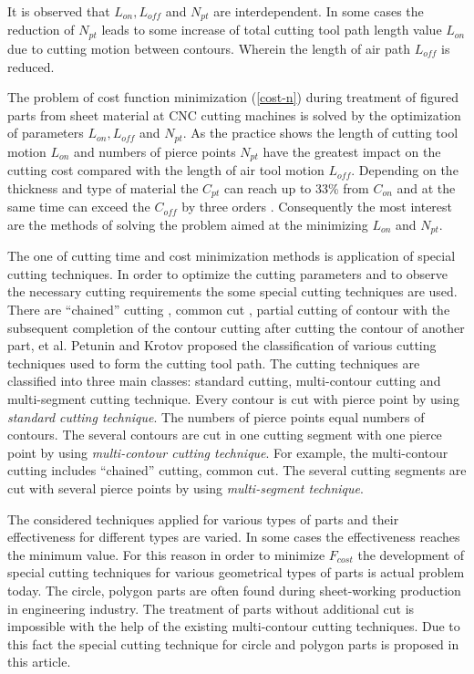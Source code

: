 \documentclass[runningheads]{llncs}
\begin{document}
It is observed that $L_{on}, L_{off}$ and $N_{pt}$
are interdependent.
In some cases the reduction of  $N_{pt}$
leads to some increase of total cutting tool path length value $L_{on}$
due to cutting motion between contours.
Wherein the length of air path $L_{off}$ is reduced.

The problem of cost function minimization (\ref{cost-n})
during treatment of figured parts from sheet material
at CNC cutting machines is solved by the optimization of parameters
$L_{on}, L_{off}$ and $N_{pt}$.
As the practice shows the length of cutting tool motion  $L_{on}$
and numbers of pierce points $N_{pt}$
have the greatest impact on the cutting cost compared with the length of air tool motion $L_{off}$.
Depending on the thickness and type of material the $C_{pt}$
can reach up to 33\% from $C_{on}$
and at the same time can exceed the $C_{off}$
by three orders \cite{ru14}.
Consequently the most interest are the methods of solving the problem aimed at the minimizing
$L_{on}$ and $N_{pt}$.

The one of cutting time and cost minimization methods is
application of special cutting techniques.
In order to optimize the cutting parameters
and to observe the necessary cutting requirements
the some special cutting techniques are used.
There are ``chained'' cutting \cite{ru28},
common cut \cite{ru25}, partial cutting of contour
with the subsequent completion of the contour cutting
after cutting the contour of another part, et al.
Petunin and Krotov \cite{ru25} proposed the
classification of various cutting techniques
used to form the cutting tool path.
The cutting techniques are classified into three main classes:
standard cutting, multi-contour cutting and multi-segment cutting technique.
Every contour is cut with pierce point by using
\textit{standard cutting technique}.
The numbers of pierce points equal numbers of contours.
The several contours are cut in one cutting segment
with one pierce point by using
\textit{multi-contour cutting technique}.
For example, the multi-contour cutting includes ``chained'' cutting, common cut.
The several cutting segments are cut with several pierce points by using
\textit{multi-segment technique}.

The considered techniques applied for various types of parts
and their effectiveness for different types are varied.
In some cases the effectiveness reaches the minimum value.
For this reason in order to minimize $F_{cost}$
the development of special cutting techniques
for various geometrical types of parts is actual problem today.
The circle, polygon parts are often found during sheet-working production
in engineering industry.
The treatment of parts without additional cut is impossible
with the help of the existing multi-contour cutting techniques.
Due to this fact the special cutting technique
for circle and polygon parts is proposed in this article.
\end{document}
